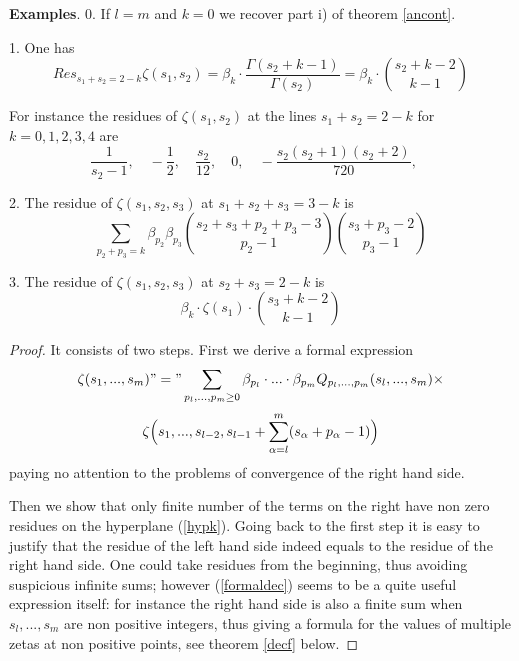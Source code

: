 \documentclass[10pt]{article}
\begin{document}
{\bf Examples}. 0. If $l=m$ and $k=0$ we recover part i) of theorem \ref{ancont}.

1.  One has
$$%
Res_{s_1+s_2 = 2-k}\zeta(s_1,s_2) = \beta_k \cdot \frac{ \Gamma(s_2+k-1)}{\Gamma(s_2) } = \beta_k \cdot \binom{ s_2 + k-2 }{ k-1}
$$%
 

For instance the residues of $\zeta(s_1,s_2)$ at the lines $s_1+s_2 = 2-k$ for $k = 0,1,2,3,4$ are
$$
 \frac{ 1}{s_2-1}, \quad -\frac{ 1}{ 2}, \quad \frac{ s_2}{12 }, \quad
 0, \quad -\frac{ s_2(s_2+1)(s_2+2)}{ 720}, \quad
$$


2. The residue of $\zeta(s_1, s_2, s_3)$ at $s_1 + s_2 +s_3 = 3-k$ is
$$
\sum_{p_2+ p_3 =k} \beta_{p_2} \beta_{p_3} \binom{
   s_2 + s_3 + p_2+ p_3  -3 }{ p_2-1} \binom{  s_3 + p_3   - 2 }{ p_3-1}
$$
  
3. The residue of $\zeta(s_1, s_2, s_3)$ at $  s_2 +s_3 = 2-k$ is
$$
    \beta_{ k} \cdot \zeta(s_1) \cdot  \binom{ s_3 +  k   - 2 }{  k-1}
$$

 
\begin{proof}  It  consists of two steps. 
First we derive a formal expression 
$$
\zeta(s_1,  ... , s_m) "=" \sum_{p_l,...,p_m \geq 0} \beta_{p_l} \cdot ... \cdot 
\beta_{p_m} Q_{p_l,...,p_m}(s_l,  ... , s_m) \times
$$
\begin{equation} \label{formaldec}
\zeta\Bigl(s_1,...,s_{l-2}, s_{l-1} + \sum_{\alpha =l}^m (s_{\alpha}  +  p_{\alpha}-1) 
\Bigr)
\end{equation}
paying no attention to the problems of convergence of the right hand side.

Then we show that only finite number of the terms on the right 
have non zero residues on the hyperplane (\ref{hypk}). Going back to the first step 
it  is  easy  to justify that the residue of the left hand side 
indeed equals to the residue of 
the right hand side. One  could  take residues from the beginning, 
thus avoiding suspicious infinite sums;
however (\ref{formaldec})  seems to be a quite  useful  expression itself: for instance 
 the right hand side is also a finite sum when $s_l,...,s_m$ are non 
positive integers, thus giving a formula for the values of multiple zetas at 
non positive points, see theorem \ref{decf} below. 


\end{proof}
\end{document}
